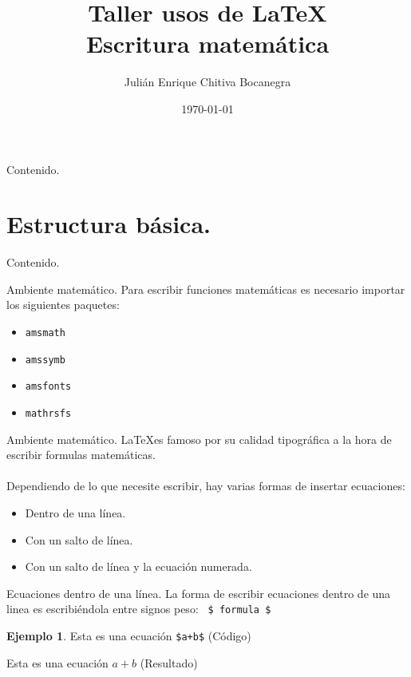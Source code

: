 \documentclass[dvipsnames,xcolor, handout]{beamer}
\title{Taller usos de \LaTeX \\ \small{Escritura matemática} \vspace*{-0.2cm}}
\author[Julián Chitiva Bocanegra]{Julián Enrique Chitiva Bocanegra}
\institute[Uniandes] 
{Universidad de los Andes\\ Facultad de Economía}
\date{\today}
\theoremstyle{plain}
\theoremstyle{definition}
\newtheorem{ejemplo}{Ejemplo}
\begin{document}
\begin{frame}
  \titlepage
\end{frame}

\begin{frame}{Contenido.}
  \tableofcontents%
\end{frame}

\section{Estructura básica.}
\begin{frame}{Contenido.}
  \tableofcontents[currentsection]
\end{frame}

\begin{frame}[fragile]{Ambiente matemático.}
    Para escribir funciones matemáticas es necesario importar los siguientes paquetes:
    \begin{itemize}
        \item \verb!amsmath!
        \item \verb!amssymb!
        \item \verb!amsfonts!
        \item \verb!mathrsfs!
    \end{itemize}
\end{frame}
\begin{frame}{Ambiente matemático.}
 \LaTeX es famoso por su calidad tipográfica a la hora de escribir formulas matemáticas. \\~\\
 
 Dependiendo de lo que necesite escribir, hay varias formas de insertar ecuaciones:
 \begin{itemize}
     \item Dentro de una línea.
     \item Con un salto de línea.
     \item Con un salto de línea y la ecuación numerada.
 \end{itemize}
\end{frame}

\begin{frame}[fragile]{Ecuaciones dentro de una línea.}
    La forma de escribir ecuaciones dentro de una linea es escribiéndola entre signos peso: \verb! $ formula $! 
    
    \begin{ejemplo}
    Esta es una ecuación \verb!$a+b$! (Código)
    
    Esta es una ecuación $a+b$ (Resultado)
    
    \end{ejemplo}
\end{frame}
\end{document}
